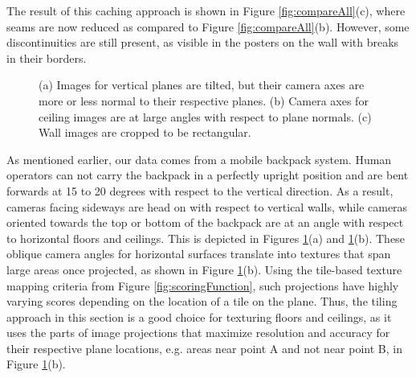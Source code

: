 \documentclass[]{spie}  %
\begin{document}
The result of this caching approach is shown in Figure
\ref{fig:compareAll}(c), where seams are now reduced as compared to
Figure \ref{fig:compareAll}(b). However, some discontinuities are
still present, as visible in the posters on the wall with breaks
in their borders.

\begin{figure}
  \centering
  \centering
  \centering
  \caption{(a) Images for vertical planes are tilted, but their camera
    axes are more or less normal to their respective planes. (b)
    Camera axes for ceiling images are at large angles with respect to
    plane normals. (c) Wall images are cropped to be rectangular.}
  \label{fig:projectionAngles}
\end{figure}


As mentioned earlier, our data comes from a mobile backpack
system. Human operators can not carry the backpack in a perfectly
upright position and are bent forwards at 15 to 20 degrees with
respect to the vertical direction. As a result, cameras facing
sideways are head on with respect to vertical walls, while cameras
oriented towards the top or bottom of the backpack are at an angle
with respect to horizontal floors and ceilings. This is depicted in
Figures \ref{fig:projectionAngles}(a) and
\ref{fig:projectionAngles}(b). These oblique camera angles for
horizontal surfaces translate into textures that span large areas once
projected, as shown in Figure \ref{fig:projectionAngles}(b). Using the
tile-based texture mapping criteria from Figure
\ref{fig:scoringFunction}, such projections have highly varying scores
depending on the location of a tile on the plane. Thus, the tiling
approach in this section is a good choice for texturing floors and
ceilings, as it uses the parts of image projections that maximize
resolution and accuracy for their respective plane locations,
e.g. areas near point A and not near point B, in Figure
\ref{fig:projectionAngles}(b).
\end{document}
